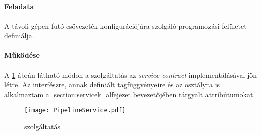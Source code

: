 \subsection{}

\paragraph{Feladata} A távoli gépen futó csővezeték konfigurációjára szolgáló programozási felületet definiálja. 

\paragraph{Működése} A \ref{fig:PipelineService_class} ábrán látható módon a szolgáltatás az  \emph{service contract} implementálásával jön létre. Az interfészre, annak definiált tagfüggvényeire és az osztályra is alkalmaztam a \ref{section:servicek} alfejezet bevezetőjében tárgyalt attribútumokat.

\begin{figure}[h]
\vspace{.5cm}
\texttt{[image: PipelineService.pdf]}
\centering
\vspace{.2cm}
\caption{ szolgáltatás}
\vspace{.5cm}
\label{fig:PipelineService_class}
\end{figure}

